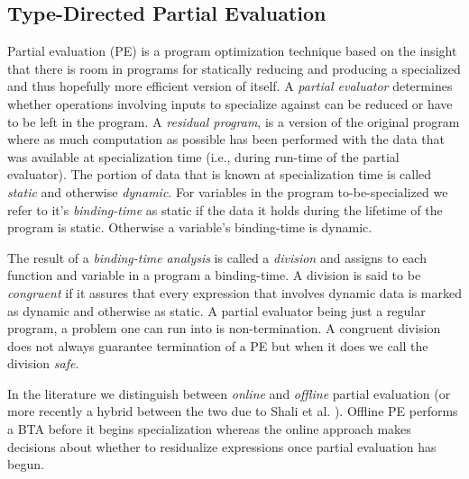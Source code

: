 \documentclass[a4paper,12pt,twoside,openright]{report}
\theoremstyle{definition}
\begin{document}
\subsection{Type-Directed Partial Evaluation}
Partial evaluation (PE) is a program optimization technique based on the insight that there is room in programs for statically reducing and producing a specialized and thus hopefully more efficient version of itself. A \textit{partial evaluator} determines whether operations involving inputs to specialize against can be reduced or have to be left in the program. A \textit{residual program}, is a version of the original program where as much computation as possible has been performed with the data that was available at specialization time (i.e., during run-time of the partial evaluator). The portion of data that is known at specialization time is called \textit{static} and otherwise \textit{dynamic}. For variables in the program to-be-specialized we refer to it's \textit{binding-time} as static if the data it holds during the lifetime of the program is static. Otherwise a variable's binding-time is dynamic.

The result of a \textit{binding-time analysis} is called a \textit{division} and assigns to each function and variable in a program a binding-time. A division is said to be \textit{congruent} if it assures that every expression that involves dynamic data is marked as dynamic and otherwise as static. A partial evaluator being just a regular program, a problem one can run into is non-termination. A congruent division does not always guarantee termination of a PE but when it does we call the division \textit{safe}.



In the literature we distinguish between \textit{online} and \textit{offline} partial evaluation \cite{jones1993partial} (or more recently a hybrid between the two due to Shali et al. \cite{shali2011hybrid}). Offline PE performs a BTA before it begins specialization whereas the online approach makes decisions about whether to residualize expressions once partial evaluation has begun.
\end{document}
